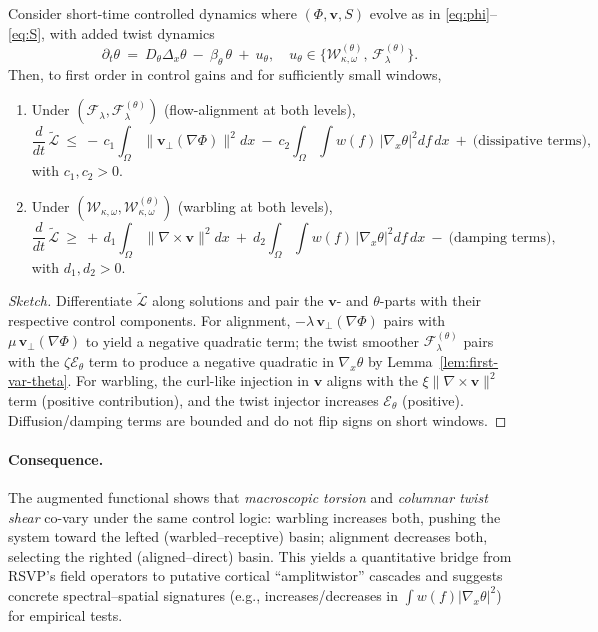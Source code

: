 \documentclass[a4paper,11pt]{article}
\begin{document}
\begin{proposition}
\label{prop:aug-monotone}
Consider short-time controlled dynamics where $(\Phi,\mathbf{v},S)$ evolve as in
\eqref{eq:phi}–\eqref{eq:S}, with added twist dynamics
\[
\partial_t \theta \ =\ D_\theta \Delta_x \theta\ -\ \beta_\theta\,\theta\ +\ u_\theta,
\quad u_\theta \in \{\mathcal{W}^{(\theta)}_{\kappa,\omega},\, \mathcal{F}^{(\theta)}_{\lambda}\}.
\]
Then, to first order in control gains and for sufficiently small windows,
\begin{enumerate}
\item Under $(\mathcal{F}_\lambda,\mathcal{F}^{(\theta)}_{\lambda})$ (flow-alignment at both levels),
\[
\frac{d}{dt}\,\widetilde{\mathcal{L}}\ \le\ -\,c_1 \!\int_\Omega \!\|\mathbf{v}_\perp(\nabla\Phi)\|^2 dx
\ -\ c_2 \!\int_\Omega \!\!\int w(f)\,\big|\nabla_x \theta\big|^2 df\,dx\ +\ \text{(dissipative terms)},
\]
with $c_1,c_2>0$.
\item Under $(\mathcal{W}_{\kappa,\omega},\mathcal{W}^{(\theta)}_{\kappa,\omega})$ (warbling at both levels),
\[
\frac{d}{dt}\,\widetilde{\mathcal{L}}\ \ge\ +\,d_1 \!\int_\Omega \!\|\nabla\times \mathbf{v}\|^2 dx
\ +\ d_2 \!\int_\Omega \!\!\int w(f)\,\big|\nabla_x \theta\big|^2 df\,dx\ -\ \text{(damping terms)},
\]
with $d_1,d_2>0$.
\end{enumerate}
\end{proposition}

\begin{proof}[Sketch]
Differentiate $\widetilde{\mathcal{L}}$ along solutions and pair the
$\mathbf{v}$- and $\theta$-parts with their respective control components. For
alignment, $-\lambda\,\mathbf{v}_\perp(\nabla\Phi)$ pairs with
$\mu\,\mathbf{v}_\perp(\nabla\Phi)$ to yield a negative quadratic term; the
twist smoother $\mathcal{F}^{(\theta)}_\lambda$ pairs with the $\zeta\mathcal{E}_\theta$
term to produce a negative quadratic in $\nabla_x\theta$ by
Lemma~\ref{lem:first-var-theta}. For warbling, the curl-like injection in
$\mathbf{v}$ aligns with the $\xi\|\nabla\times \mathbf{v}\|^2$ term (positive
contribution), and the twist injector increases $\mathcal{E}_\theta$ (positive).
Diffusion/damping terms are bounded and do not flip signs on short windows.
\end{proof}

\paragraph{Consequence.}
The augmented functional shows that \emph{macroscopic torsion} and \emph{columnar
twist shear} co-vary under the same control logic: warbling increases both,
pushing the system toward the lefted (warbled–receptive) basin; alignment
decreases both, selecting the righted (aligned–direct) basin. This yields a
quantitative bridge from RSVP’s field operators to putative cortical
``amplitwistor'' cascades and suggests concrete spectral–spatial signatures
(e.g., increases/decreases in $\int w(f)|\nabla_x\theta|^2$) for empirical tests.
\end{document}
